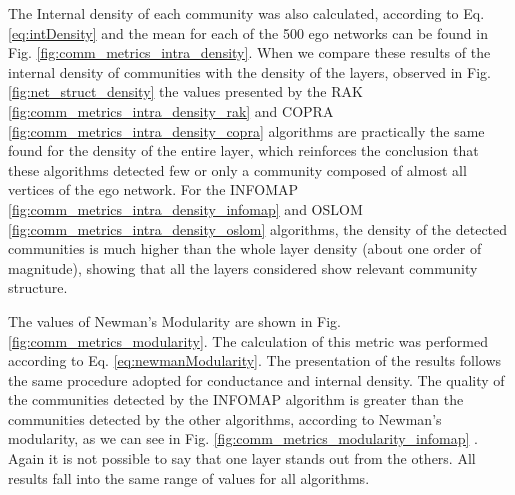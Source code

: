The Internal density of each community was also calculated, according to Eq. \ref{eq:intDensity} and the mean for each of the 500 ego networks can be found in Fig. \ref{fig:comm_metrics_intra_density}. When we compare these results of the internal density of communities with the density of the layers, observed in Fig. \ref{fig:net_struct_density} the values presented by the RAK \ref{fig:comm_metrics_intra_density_rak} and COPRA \ref{fig:comm_metrics_intra_density_copra} algorithms are practically the same found for the density of the entire layer, which reinforces the conclusion that these algorithms detected few or only a community composed of almost all vertices of the ego network. For the INFOMAP \ref{fig:comm_metrics_intra_density_infomap} and OSLOM \ref{fig:comm_metrics_intra_density_oslom} algorithms, the density of the detected communities is much higher than the whole layer density (about one order of magnitude), showing  that all the layers considered show relevant community structure.


The values of Newman's Modularity are shown in Fig. \ref{fig:comm_metrics_modularity}. The calculation of this metric was performed according to Eq. \ref{eq:newmanModularity}. The presentation of the results follows the same procedure adopted for conductance and internal density. The quality of the communities detected by the INFOMAP algorithm is greater than the communities detected by the other algorithms, according to Newman's modularity, as we can see in Fig. \ref{fig:comm_metrics_modularity_infomap} . Again it is not possible to say that one layer stands out from the others. All results fall into the same range of values for all algorithms.

